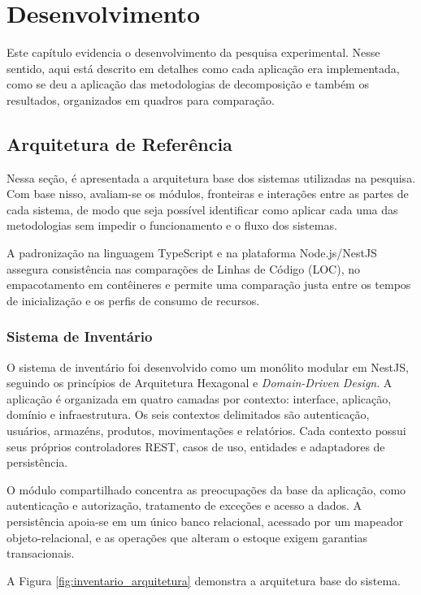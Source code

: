 ﻿\chapter{Desenvolvimento}
\label{cap:desenvolvimento}

Este capítulo evidencia o desenvolvimento da pesquisa experimental. Nesse sentido, aqui está descrito em detalhes como cada aplicação era implementada, como se deu a aplicação das metodologias de decomposição e também os resultados, organizados em quadros para comparação.

\section{Arquitetura de Referência}
\label{sec:arquitetura_referencia}
Nessa seção, é apresentada a arquitetura base dos sistemas utilizadas na pesquisa. Com base nisso, avaliam-se os módulos, fronteiras e interações entre as partes de cada sistema, de modo que seja possível identificar como aplicar cada uma das metodologias sem impedir o funcionamento e o fluxo dos sistemas.

A padronização na linguagem TypeScript e na plataforma Node.js/NestJS assegura consistência nas comparações de Linhas de Código (LOC), no empacotamento em contêineres e permite uma comparação justa entre os tempos de inicialização e os perfis de consumo de recursos.

\subsection*{Sistema de Inventário}

O sistema de inventário foi desenvolvido como um monólito modular em NestJS, seguindo os princípios de Arquitetura Hexagonal e \textit{Domain-Driven Design}. A aplicação é organizada em quatro camadas por contexto: interface, aplicação, domínio e infraestrutura. Os seis contextos delimitados são autenticação, usuários, armazéns, produtos, movimentações e relatórios. Cada contexto possui seus próprios controladores REST, casos de uso, entidades e adaptadores de persistência.

O módulo compartilhado concentra as preocupações da base da aplicação, como autenticação e autorização, tratamento de exceções e acesso a dados. A persistência apoia-se em um único banco relacional, acessado por um mapeador objeto-relacional, e as operações que alteram o estoque exigem garantias transacionais.

A Figura \ref{fig:inventario_arquitetura} demonstra a arquitetura base do sistema.

